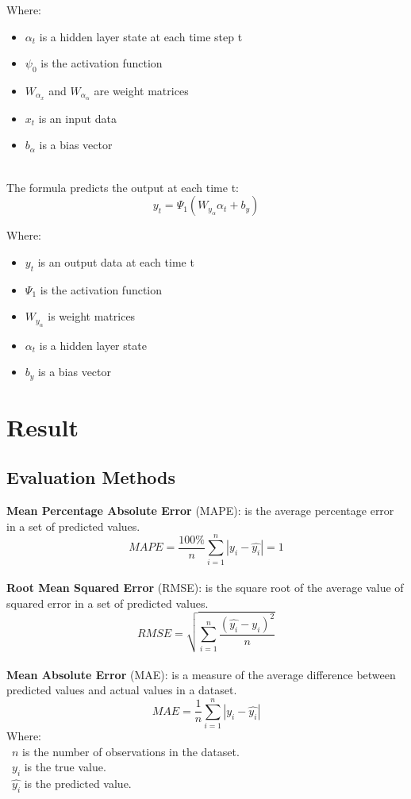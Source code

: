 \documentclass{ieeeojies}
\begin{document}
Where:\\
    \begin{itemize}
        \item $\alpha_t$ is a hidden layer state at each time step t
        \item $\psi_0$ is the activation function
        \item $W_\alpha_x$ and $W_\alpha_\alpha$ are weight matrices
        \item $x_t$ is an input data
        \item $b_\alpha$ is a bias vector
    \end{itemize}\\

The formula predicts the output at each time t:\\
\[ y_t = \Psi_1(W_y_\alpha\alpha_t + b_y) \]

Where:\\
    \begin{itemize}
        \item $y_t$ is an output data at each time t
        \item $\Psi_1$ is the activation function
        \item $W_y_\alpha$ is weight matrices
        \item $\alpha_t$ is a hidden layer state
        \item $b_y$ is a bias vector
    \end{itemize}
\section{Result}
\subsection{Evaluation Methods}
\textbf{Mean Percentage Absolute Error} (MAPE): is the average percentage error in a set of predicted values.\\
\[MAPE=\frac{100\%}{n}  \sum_{i=1}^{n} |y_i-\hat{y_i} |  = 1 \]\\
\textbf{Root Mean Squared Error} (RMSE): is the square root of the average value of squared error in a set of predicted values.\\
\[RMSE=\sqrt{\sum_{i=1}^{n} \frac{(\hat{y_i}-y_i )^2}{n} }\]\\
\textbf{Mean Absolute Error} (MAE): is a measure of the average difference between predicted values and actual values in a dataset.\\
\[MAE = \frac{1}{n} \sum_{i=1}^{n} |y_i - \hat{y_i}| \]
Where: \\
	\indent\textbullet\ \(n\) is the number of observations in the dataset.\\
	\indent\textbullet\ \(y_i\)  is the true value.\\
	\indent\textbullet\ \(\hat{y_i}\) is the predicted value.
\end{document}
